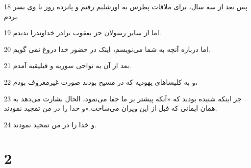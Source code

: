 \par 18 پس بعد از سه سال، برای ملاقات پطرس به اورشلیم رفتم و پانزده روز با وی بسر بردم.
\par 19 اما از سایر رسولان جز یعقوب برادر خداوندرا ندیدم.
\par 20 اما درباره آنچه به شما می‌نویسم، اینک در حضور خدا دروغ نمی گویم.
\par 21 بعد از آن به نواحی سوریه و قیلیقیه آمدم.
\par 22 و به کلیساهای یهودیه که در مسیح بودند صورت غیرمعروف بودم،
\par 23 جز اینکه شنیده بودند که «آنکه پیشتر بر ما جفا می‌نمود، الحال بشارت می‌دهد به همان ایمانی که قبل از این ویران می‌ساخت.»و خدا را در من تمجید نمودند.
\par 24 و خدا را در من تمجید نمودند.

\chapter{2}

